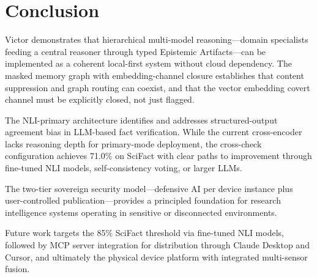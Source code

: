 \documentclass[letterpaper]{article}          %
\theoremstyle{plain}
\theoremstyle{definition}
\theoremstyle{remark}
\begin{document}
\section{Conclusion}

Victor demonstrates that hierarchical multi-model reasoning---domain specialists
feeding a central reasoner through typed Epistemic Artifacts---can be implemented
as a coherent local-first system without cloud dependency. The masked memory
graph with embedding-channel closure establishes that content suppression and
graph routing can coexist, and that the vector embedding covert channel must be
explicitly closed, not just flagged.

The NLI-primary architecture identifies and addresses structured-output agreement
bias in LLM-based fact verification. While the current cross-encoder lacks
reasoning depth for primary-mode deployment, the cross-check configuration
achieves 71.0\% on SciFact with clear paths to improvement through fine-tuned
NLI models, self-consistency voting, or larger LLMs.

The two-tier sovereign security model---defensive AI per device instance plus
user-controlled publication---provides a principled foundation for research
intelligence systems operating in sensitive or disconnected environments.

Future work targets the 85\% SciFact threshold via fine-tuned NLI models,
followed by MCP server integration for distribution through Claude Desktop and
Cursor, and ultimately the physical device platform with integrated multi-sensor
fusion.



\end{document}
